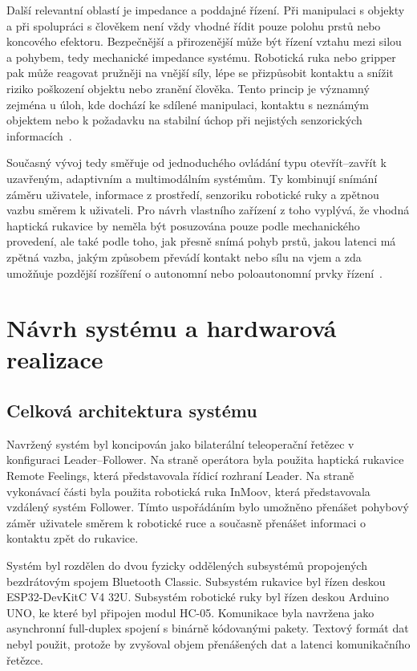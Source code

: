 \documentclass[FZS,DP]{tulthesis}
\begin{document}
Další relevantní oblastí je impedance a poddajné řízení. Při manipulaci s objekty a při spolupráci s člověkem není vždy vhodné řídit pouze polohu prstů nebo koncového efektoru. Bezpečnější a přirozenější může být řízení vztahu mezi silou a pohybem, tedy mechanické impedance systému. Robotická ruka nebo gripper pak může reagovat pružněji na vnější síly, lépe se přizpůsobit kontaktu a snížit riziko poškození objektu nebo zranění člověka. Tento princip je významný zejména u úloh, kde dochází ke sdílené manipulaci, kontaktu s neznámým objektem nebo k požadavku na stabilní úchop při nejistých senzorických informacích~\cite{Dutta2002,Xiong2024}.

Současný vývoj tedy směřuje od jednoduchého ovládání typu otevřít--zavřít k uzavřeným, adaptivním a multimodálním systémům. Ty kombinují snímání záměru uživatele, informace z prostředí, senzoriku robotické ruky a zpětnou vazbu směrem k uživateli. Pro návrh vlastního zařízení z toho vyplývá, že vhodná haptická rukavice by neměla být posuzována pouze podle mechanického provedení, ale také podle toho, jak přesně snímá pohyb prstů, jakou latenci má zpětná vazba, jakým způsobem převádí kontakt nebo sílu na vjem a zda umožňuje pozdější rozšíření o autonomní nebo poloautonomní prvky řízení~\cite{Song2023823,Sul2025627,Thomas2023110,Xiong2024}.

\chapter{Návrh systému a hardwarová realizace}
\label{chap:navrh-systemu}

\section{Celková architektura systému}
\label{sec:celkova-architektura}

Navržený systém byl koncipován jako bilaterální teleoperační řetězec v konfiguraci Leader--Follower. Na straně operátora byla použita haptická rukavice Remote Feelings, která představovala řídicí rozhraní Leader. Na straně vykonávací části byla použita robotická ruka InMoov, která představovala vzdálený systém Follower. Tímto uspořádáním bylo umožněno přenášet pohybový záměr uživatele směrem k robotické ruce a současně přenášet informaci o kontaktu zpět do rukavice.

Systém byl rozdělen do dvou fyzicky oddělených subsystémů propojených bezdrátovým spojem Bluetooth Classic. Subsystém rukavice byl řízen deskou ESP32-DevKitC V4 32U. Subsystém robotické ruky byl řízen deskou Arduino UNO, ke které byl připojen modul HC-05. Komunikace byla navržena jako asynchronní full-duplex spojení s binárně kódovanými pakety. Textový formát dat nebyl použit, protože by zvyšoval objem přenášených dat a latenci komunikačního řetězce.
\end{document}
